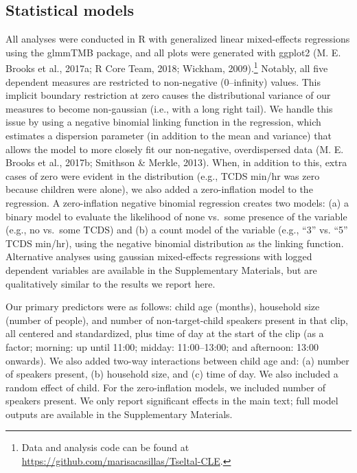 \documentclass[floatsintext,man]{apa6}
\theoremstyle{definition}
\theoremstyle{definition}
\theoremstyle{definition}
\theoremstyle{remark}
\begin{document}
\subsection{Statistical models}\label{statistical-models}

All analyses were conducted in R with generalized linear mixed-effects
regressions using the glmmTMB package, and all plots were generated with
ggplot2 (M. E. Brooks et al., 2017a; R Core Team, 2018; Wickham,
2009).\footnote{Data and analysis code can be found at
  \url{https://github.com/marisacasillas/Tseltal-CLE}.} Notably, all
five dependent measures are restricted to non-negative (0--infinity)
values. This implicit boundary restriction at zero causes the
distributional variance of our measures to become non-gaussian (i.e.,
with a long right tail). We handle this issue by using a negative
binomial linking function in the regression, which estimates a
dispersion parameter (in addition to the mean and variance) that allows
the model to more closely fit our non-negative, overdispersed data (M.
E. Brooks et al., 2017b; Smithson \& Merkle, 2013). When, in addition to
this, extra cases of zero were evident in the distribution (e.g., TCDS
min/hr was zero because children were alone), we also added a
zero-inflation model to the regression. A zero-inflation negative
binomial regression creates two models: (a) a binary model to evaluate
the likelihood of none vs.~some presence of the variable (e.g., no
vs.~some TCDS) and (b) a count model of the variable (e.g., \enquote{3}
vs. \enquote{5} TCDS min/hr), using the negative binomial distribution
as the linking function. Alternative analyses using gaussian
mixed-effects regressions with logged dependent variables are available
in the Supplementary Materials, but are qualitatively similar to the
results we report here.

Our primary predictors were as follows: child age (months), household
size (number of people), and number of non-target-child speakers present
in that clip, all centered and standardized, plus time of day at the
start of the clip (as a factor; morning: up until 11:00; midday:
11:00--13:00; and afternoon: 13:00 onwards). We also added two-way
interactions between child age and: (a) number of speakers present, (b)
household size, and (c) time of day. We also included a random effect of
child. For the zero-inflation models, we included number of speakers
present. We only report significant effects in the main text; full model
outputs are available in the Supplementary Materials.
\end{document}

